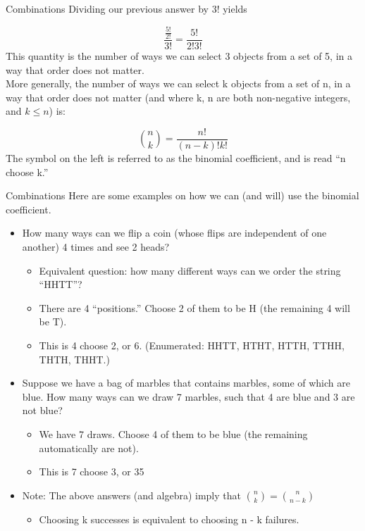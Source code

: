 \documentclass[aspectratio=169]{../latex_main/tntbeamer}  %
\begin{document}
	
	\begin{frame}{Combinations}
	    Dividing our previous answer by 3! yields


        \begin{equation*}
            \frac{\frac{5!}{2!}}{3!} = \frac{5!}{2!3!}
        \end{equation*}
        This quantity is the number of ways we can select 3 objects from a set of 5, in a way that order does not matter.\\
        
        More generally, the number of ways we can select k objects from a set of n, in a way that order does not matter (and where k, n are both non-negative integers, and $k \leq n$) is:

        \begin{equation*}
            \binom{n}{k}= \frac{n!}{(n-k)!k!}
        \end{equation*}
        The symbol on the left is referred to as the binomial coefficient, and is read “n choose k.”

	\end{frame}
	
	
	\begin{frame}{Combinations}
	    Here are some examples on how we can (and will) use the binomial coefficient.
        \begin{itemize}
            \item How many ways can we flip a coin (whose flips are independent of one another) 4 times and see 2 heads?
            \begin{itemize}
                \item Equivalent question: how many different ways can we order the string “HHTT”?
                \item There are 4 “positions.” Choose 2 of them to be H (the remaining 4 will be T).
                \item This is 4 choose 2, or 6. (Enumerated: HHTT, HTHT, HTTH, TTHH, THTH, THHT.)
            \end{itemize}
            \item Suppose we have a bag of marbles that contains marbles, some of which are blue. How many ways can we draw 7 marbles, such that 4 are blue and 3 are not blue?
            \begin{itemize}
                \item We have 7 draws. Choose 4 of them to be blue (the remaining automatically are not).
                \item This is 7 choose 3, or 35 
            \end{itemize}
            \item Note: The above answers (and algebra) imply that $\binom{n}{k}=\binom{n}{n-k}$
            \begin{itemize}
                \item Choosing k successes is equivalent to choosing n - k failures.
            \end{itemize}
        \end{itemize}

	\end{frame}
	
\end{document}
